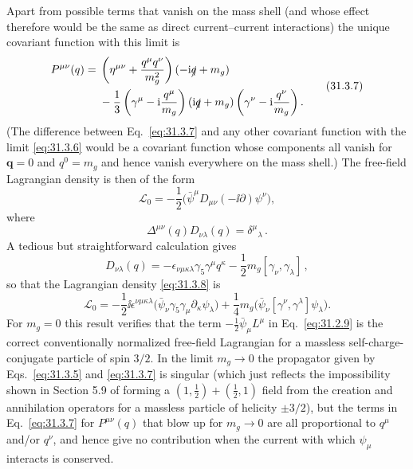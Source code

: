 Apart from possible terms that vanish on the mass shell (and whose effect
therefore would be the same as direct current--current interactions) the
unique covariant function with this limit is
\begin{equation}
  \begin{aligned}
  P^{\mu\nu}(q)={}&
  \left(\eta^{\mu\nu}+\frac{q^\mu q^\nu}{m_g^2}\right)
  (-\mathrm{i}\slashed{q}+m_g)
  \\
  &-\frac13
  \left(\gamma^\mu-\mathrm{i}\frac{q^\mu}{m_g}\right)
  (\mathrm{i}\slashed{q}+m_g)
  \left(\gamma^\nu-\mathrm{i}\frac{q^\nu}{m_g}\right).
  \end{aligned}
  \tag{31.3.7}\label{eq:31.3.7}
\end{equation}
(The difference between Eq.~\eqref{eq:31.3.7} and any other covariant
function with the limit \eqref{eq:31.3.6} would be a covariant function
whose components all vanish for \(\boldsymbol q=0\) and \(q^0=m_g\) and
hence vanish everywhere on the mass shell.) The free-field Lagrangian
density is then of the form
\begin{equation}
  \mathcal L_0
  =-\frac12\bigl(\bar\psi^\mu D_{\mu\nu}(-\ii\partial)\psi^\nu\bigr),
  \tag{31.3.8}\label{eq:31.3.8}
\end{equation}
where
\begin{equation}
  \Delta^{\mu\nu}(q)D_{\nu\lambda}(q)=\delta^\mu{}_\lambda\,.
  \tag{31.3.9}\label{eq:31.3.9}
\end{equation}
A tedious but straightforward calculation gives
\begin{equation}
  D_{\nu\lambda}(q)
  =-\epsilon_{\nu\mu\kappa\lambda}\gamma_5\gamma^\mu q^\kappa
   -\frac12m_g[\gamma_\nu,\gamma_\lambda]\,,
  \tag{31.3.10}\label{eq:31.3.10}
\end{equation}
so that the Lagrangian density \eqref{eq:31.3.8} is
\begin{equation}
  \mathcal L_0
  =-\frac12\ii\epsilon^{\nu\mu\kappa\lambda}
    \bigl(\bar\psi_\nu\gamma_5\gamma_\mu
    \partial_\kappa\psi_\lambda\bigr)
   +\frac14m_g
    \bigl(\bar\psi_\nu[\gamma^\nu,\gamma^\lambda]\psi_\lambda\bigr).
  \tag{31.3.11}\label{eq:31.3.11}
\end{equation}
For \(m_g=0\) this result verifies that the term
\(-\frac12\bar\psi_\mu L^\mu\) in Eq.~\eqref{eq:31.2.9} is the correct
conventionally normalized free-field Lagrangian for a massless
self-charge-conjugate particle of spin \(3/2\). In the limit \(m_g\to0\)
the propagator given by Eqs.~\eqref{eq:31.3.5} and \eqref{eq:31.3.7} is
singular (which just reflects the impossibility shown in Section 5.9 of
forming a \((1,\frac12)+(\frac12,1)\) field from the creation and
annihilation operators for a massless particle of helicity \(\pm3/2\)),
but the terms in Eq.~\eqref{eq:31.3.7} for \(P^{\mu\nu}(q)\) that blow up
for \(m_g\to0\) are all proportional to \(q^\mu\) and/or \(q^\nu\), and
hence give no contribution when the current with which \(\psi_\mu\)
interacts is conserved.


